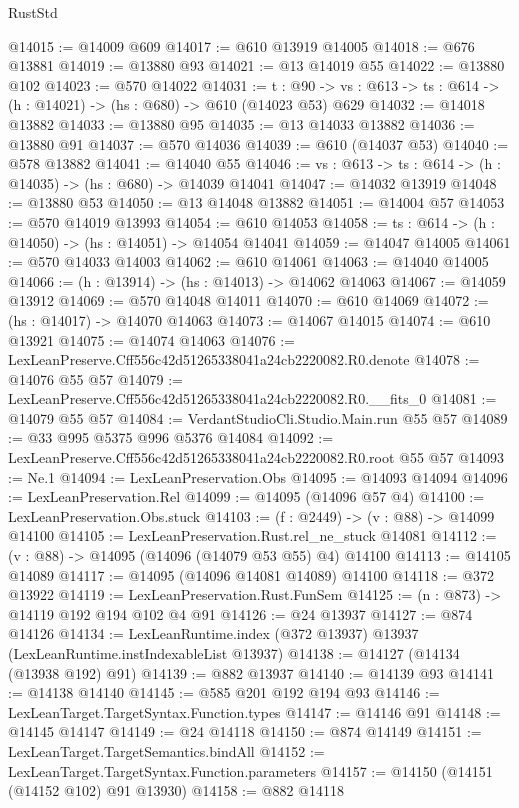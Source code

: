 \begin{lexlean}{RustStd}
\begin{coremodule}
@14015 := @14009 @609
@14017 := @610 @13919 @14005
@14018 := @676 @13881
@14019 := @13880 @93
@14021 := @13 @14019 @55
@14022 := @13880 @102
@14023 := @570 @14022
@14031 := {t : @90} ->
  {vs : @613} -> {ts : @614} -> (h : @14021) -> (hs : @680) -> @610 (@14023 @53) @629
@14032 := @14018 @13882
@14033 := @13880 @95
@14035 := @13 @14033 @13882
@14036 := @13880 @91
@14037 := @570 @14036
@14039 := @610 (@14037 @53)
@14040 := @578 @13882
@14041 := @14040 @55
@14046 := {vs : @613} -> {ts : @614} -> (h : @14035) -> (hs : @680) -> @14039 @14041
@14047 := @14032 @13919
@14048 := @13880 @53
@14050 := @13 @14048 @13882
@14051 := @14004 @57
@14053 := @570 @14019 @13993
@14054 := @610 @14053
@14058 := {ts : @614} -> (h : @14050) -> (hs : @14051) -> @14054 @14041
@14059 := @14047 @14005
@14061 := @570 @14033 @14003
@14062 := @610 @14061
@14063 := @14040 @14005
@14066 := (h : @13914) -> (hs : @14013) -> @14062 @14063
@14067 := @14059 @13912
@14069 := @570 @14048 @14011
@14070 := @610 @14069
@14072 := (hs : @14017) -> @14070 @14063
@14073 := @14067 @14015
@14074 := @610 @13921
@14075 := @14074 @14063
@14076 := LexLeanPreserve.Cff556c42d51265338041a24cb2220082.R0.denote
@14078 := @14076 @55 @57
@14079 := LexLeanPreserve.Cff556c42d51265338041a24cb2220082.R0.__fits_0
@14081 := @14079 @55 @57
@14084 := VerdantStudioCli.Studio.Main.run @55 @57
@14089 := @33 @995 @5375 @996 @5376 @14084
@14092 := LexLeanPreserve.Cff556c42d51265338041a24cb2220082.R0.root @55 @57
@14093 := Ne.{1}
@14094 := LexLeanPreservation.Obs
@14095 := @14093 @14094
@14096 := LexLeanPreservation.Rel
@14099 := @14095 (@14096 @57 @4)
@14100 := LexLeanPreservation.Obs.stuck
@14103 := (f : @2449) -> (v : @88) -> @14099 @14100
@14105 := LexLeanPreservation.Rust.rel_ne_stuck @14081
@14112 := (v : @88) -> @14095 (@14096 (@14079 @53 @55) @4) @14100
@14113 := @14105 @14089
@14117 := @14095 (@14096 @14081 @14089) @14100
@14118 := @372 @13922
@14119 := LexLeanPreservation.Rust.FunSem
@14125 := (n : @873) -> @14119 @192 @194 @102 @4 @91
@14126 := @24 @13937
@14127 := @874 @14126
@14134 := LexLeanRuntime.index (@372 @13937) @13937 (LexLeanRuntime.instIndexableList @13937)
@14138 := @14127 (@14134 (@13938 @192) @91)
@14139 := @882 @13937
@14140 := @14139 @93
@14141 := @14138 @14140
@14145 := @585 @201 @192 @194 @93
@14146 := LexLeanTarget.TargetSyntax.Function.types
@14147 := @14146 @91
@14148 := @14145 @14147
@14149 := @24 @14118
@14150 := @874 @14149
@14151 := LexLeanTarget.TargetSemantics.bindAll
@14152 := LexLeanTarget.TargetSyntax.Function.parameters
@14157 := @14150 (@14151 (@14152 @102) @91 @13930)
@14158 := @882 @14118

\end{coremodule}
\end{lexlean}
